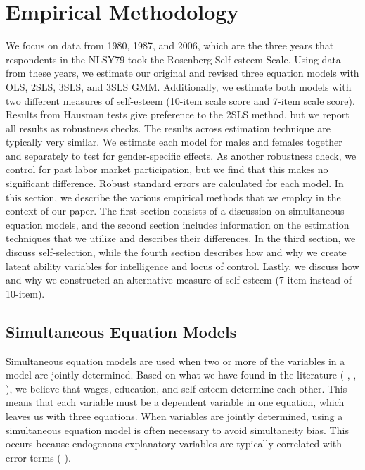 \documentclass[12pt]{report}
\newcommand{\citee}[1]{\citename{#1} \citeyear{#1}}
\begin{document}
\chapter{Empirical Methodology}

We focus on data from 1980, 1987, and 2006, which are the three years that respondents in the NLSY79 took the Rosenberg Self-esteem Scale. Using data from these years, we estimate our original and revised three equation models with OLS, 2SLS, 3SLS, and 3SLS GMM. Additionally, we estimate both models with two different measures of self-esteem (10-item scale score and 7-item scale score). Results from Hausman tests give preference to the 2SLS method, but we report all results as robustness checks. The results across estimation technique are typically very similar. We estimate each model for males and females together and separately to test for gender-specific effects. As another robustness check, we control for past labor market participation, but we find that this makes no significant difference. Robust standard errors are calculated for each model.
In this section, we describe the various empirical methods that we employ in the context of our paper. The first section consists of a discussion on simultaneous equation models, and the second section includes information on the estimation techniques that we utilize and describes their differences. In the third section, we discuss self-selection, while the fourth section describes how and why we create latent ability variables for intelligence and locus of control. Lastly, we discuss how and why we constructed an alternative measure of self-esteem (7-item instead of 10-item).

\section*{Simultaneous Equation Models}

Simultaneous equation models are used when two or more of the variables in a model are jointly determined. Based on what we have found in the literature (\citee{GVD1997}, \citee{RSS1989}, \citee{W1999}), we believe that wages, education, and self-esteem determine each other. This means that each variable must be a dependent variable in one equation, which leaves us with three equations. When variables are jointly determined, using a simultaneous equation model is often necessary to avoid simultaneity bias. This occurs because endogenous explanatory variables are typically correlated with error terms (\citee{W2009}).
\end{document}
